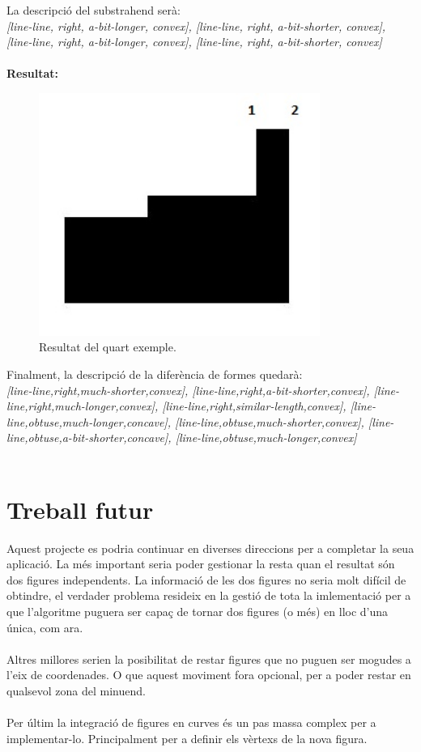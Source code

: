\documentclass{article}
\begin{document}
La descripció del substrahend serà:
\\
\emph {[line-line, right, a-bit-longer, convex], [line-line, right, a-bit-shorter, convex], [line-line, right, a-bit-longer, convex], [line-line, right, a-bit-shorter, convex]}
\\
\\
{\bf Resultat:}
\begin{figure}[!h]
\centering
\includegraphics[width=260pt]{images/res4.jpg}
\caption {Resultat del quart exemple.}
\label {fig:res4}
\end{figure}

Finalment, la descripció de la diferència de formes quedarà:
\\
\emph {[line-line,right,much-shorter,convex], [line-line,right,a-bit-shorter,convex], [line-line,right,much-longer,convex], [line-line,right,similar-length,convex], [line-line,obtuse,much-longer,concave], [line-line,obtuse,much-shorter,convex], [line-line,obtuse,a-bit-shorter,concave], [line-line,obtuse,much-longer,convex]}
\\
\\

\section{Treball futur}
Aquest projecte es podria continuar en diverses direccions per a completar la seua aplicació.
La més important seria poder gestionar la resta quan el resultat són dos figures independents.
La informació de les dos figures no seria molt difícil de obtindre, el verdader problema resideix en la gestió de tota la imlementació per a que l'algoritme puguera ser capaç de tornar dos figures (o més) en lloc d'una única, com ara.
\\
\\
Altres millores serien la posibilitat de restar figures que no puguen ser mogudes a l'eix de coordenades.
O que aquest moviment fora opcional, per a poder restar en qualsevol zona del minuend.
\\
\\
Per últim la integració de figures en curves és un pas massa complex per a implementar-lo.
Principalment per a definir els vèrtexs de la nova figura.
 
\end{document}
